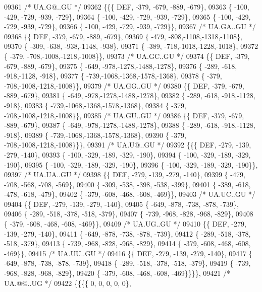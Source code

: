 \begin{DoxyCode}
09361 \textcolor{comment}{/* UA.G@..GU */}
09362 \{\{\{  DEF, -379, -679, -889, -679\},
09363 \{ -100, -429, -729, -939, -729\},
09364 \{ -100, -429, -729, -939, -729\},
09365 \{ -100, -429, -729, -939, -729\},
09366 \{ -100, -429, -729, -939, -729\}\},
09367 \textcolor{comment}{/* UA.GA..GU */}
09368 \{\{  DEF, -379, -679, -889, -679\},
09369 \{ -479, -808,-1108,-1318,-1108\},
09370 \{ -309, -638, -938,-1148, -938\},
09371 \{ -389, -718,-1018,-1228,-1018\},
09372 \{ -379, -708,-1008,-1218,-1008\}\},
09373 \textcolor{comment}{/* UA.GC..GU */}
09374 \{\{  DEF, -379, -679, -889, -679\},
09375 \{ -649, -978,-1278,-1488,-1278\},
09376 \{ -289, -618, -918,-1128, -918\},
09377 \{ -739,-1068,-1368,-1578,-1368\},
09378 \{ -379, -708,-1008,-1218,-1008\}\},
09379 \textcolor{comment}{/* UA.GG..GU */}
09380 \{\{  DEF, -379, -679, -889, -679\},
09381 \{ -649, -978,-1278,-1488,-1278\},
09382 \{ -289, -618, -918,-1128, -918\},
09383 \{ -739,-1068,-1368,-1578,-1368\},
09384 \{ -379, -708,-1008,-1218,-1008\}\},
09385 \textcolor{comment}{/* UA.GU..GU */}
09386 \{\{  DEF, -379, -679, -889, -679\},
09387 \{ -649, -978,-1278,-1488,-1278\},
09388 \{ -289, -618, -918,-1128, -918\},
09389 \{ -739,-1068,-1368,-1578,-1368\},
09390 \{ -379, -708,-1008,-1218,-1008\}\}\},
09391 \textcolor{comment}{/* UA.U@..GU */}
09392 \{\{\{  DEF, -279, -139, -279, -140\},
09393 \{ -100, -329, -189, -329, -190\},
09394 \{ -100, -329, -189, -329, -190\},
09395 \{ -100, -329, -189, -329, -190\},
09396 \{ -100, -329, -189, -329, -190\}\},
09397 \textcolor{comment}{/* UA.UA..GU */}
09398 \{\{  DEF, -279, -139, -279, -140\},
09399 \{ -479, -708, -568, -708, -569\},
09400 \{ -309, -538, -398, -538, -399\},
09401 \{ -389, -618, -478, -618, -479\},
09402 \{ -379, -608, -468, -608, -469\}\},
09403 \textcolor{comment}{/* UA.UC..GU */}
09404 \{\{  DEF, -279, -139, -279, -140\},
09405 \{ -649, -878, -738, -878, -739\},
09406 \{ -289, -518, -378, -518, -379\},
09407 \{ -739, -968, -828, -968, -829\},
09408 \{ -379, -608, -468, -608, -469\}\},
09409 \textcolor{comment}{/* UA.UG..GU */}
09410 \{\{  DEF, -279, -139, -279, -140\},
09411 \{ -649, -878, -738, -878, -739\},
09412 \{ -289, -518, -378, -518, -379\},
09413 \{ -739, -968, -828, -968, -829\},
09414 \{ -379, -608, -468, -608, -469\}\},
09415 \textcolor{comment}{/* UA.UU..GU */}
09416 \{\{  DEF, -279, -139, -279, -140\},
09417 \{ -649, -878, -738, -878, -739\},
09418 \{ -289, -518, -378, -518, -379\},
09419 \{ -739, -968, -828, -968, -829\},
09420 \{ -379, -608, -468, -608, -469\}\}\}\},
09421 \textcolor{comment}{/* UA.@@..UG */}
09422 \{\{\{\{    0,    0,    0,    0,    0\},

\end{DoxyCode}
